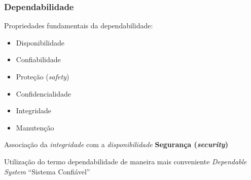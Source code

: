 \documentclass{beamer}
\begin{document}
\begin{frame}
    \frametitle{Dependabilidade}

    Propriedades fundamentais da dependabilidade:

\begin{itemize}
    \small
    \item Disponibilidade
    \item Confiabilidade
    \item Proteção (\textit{safety})
    \item Confidencialidade
    \item Integridade
    \item Manutenção
\end{itemize}

    Associação da {\it integridade} com a {\it disponibilidade} \implica \textbf
    {Segurança (\textit{security})}

    \vspace{0.25cm}

    Utilização do termo dependabilidade de maneira mais conveniente \implica
    {\it Dependable System} \implica ``Sistema Confiável''
\end{frame}
\end{document}
